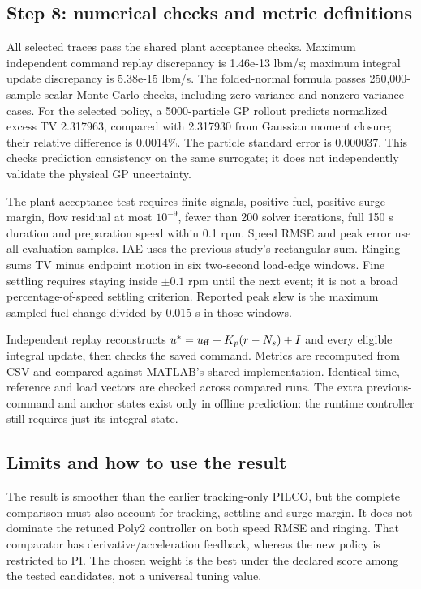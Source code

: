 \subsection{Step 8: numerical checks and metric definitions}
All selected traces pass the shared plant acceptance checks. Maximum independent command replay discrepancy is 1.46e-13 lbm/s; maximum integral update discrepancy is 5.38e-15 lbm/s. The folded-normal formula passes 250,000-sample scalar Monte Carlo checks, including zero-variance and nonzero-variance cases. For the selected policy, a 5000-particle GP rollout predicts normalized excess TV 2.317963, compared with 2.317930 from Gaussian moment closure; their relative difference is 0.0014\%. The particle standard error is 0.000037. This checks prediction consistency on the same surrogate; it does not independently validate the physical GP uncertainty.

The plant acceptance test requires finite signals, positive fuel, positive surge margin, flow residual at most $10^{-9}$, fewer than 200 solver iterations, full 150 s duration and preparation speed within 0.1 rpm. Speed RMSE and peak error use all evaluation samples. IAE uses the previous study's rectangular sum. Ringing sums TV minus endpoint motion in six two-second load-edge windows. Fine settling requires staying inside $\pm0.1$ rpm until the next event; it is not a broad percentage-of-speed settling criterion. Reported peak slew is the maximum sampled fuel change divided by 0.015 s in those windows.

Independent replay reconstructs $u^*=u_{\rm ff}+K_p(r-N_s)+I$ and every eligible integral update, then checks the saved command. Metrics are recomputed from CSV and compared against MATLAB's shared implementation. Identical time, reference and load vectors are checked across compared runs. The extra previous-command and anchor states exist only in offline prediction: the runtime controller still requires just its integral state.

\subsection{Limits and how to use the result}
The result is smoother than the earlier tracking-only PILCO, but the complete comparison must also account for tracking, settling and surge margin. It does not dominate the retuned Poly2 controller on both speed RMSE and ringing. That comparator has derivative/acceleration feedback, whereas the new policy is restricted to PI. The chosen weight is the best under the declared score among the tested candidates, not a universal tuning value.

